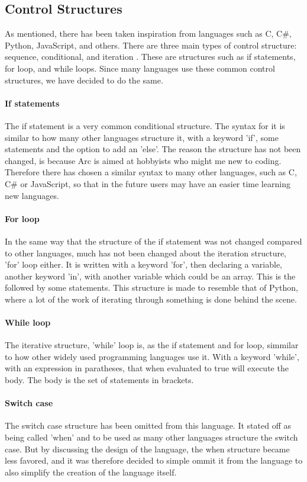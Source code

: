 \subsection{Control Structures}
As mentioned, there has been taken inspiration from languages such as C, C\#, Python, JavaScript, and others. There are three main types of control structure: sequence, conditional, and iteration \cite*{CBook}. These are structures such as if statements, for loop, and while loops. Since many languages use these common control structures, we have decided to do the same.

\paragraph*{If statements}
The if statement is a very common conditional structure. The syntax for it is similar to how many other languages structure it, with a keyword 'if', some statements and the option to add an 'else'. The reason the structure has not been changed, is because Arc is aimed at hobbyists who might me new to coding. Therefore there has chosen a similar syntax to many other languages, such as C, C\# or JavaScript, so that in the future users may have an easier time learning new languages.

\paragraph*{For loop}
In the same way that the structure of the if statement was not changed compared to other languages, much has not been changed about the iteration structure, 'for' loop either. It is written with a keyword 'for', then declaring a variable, another keyword 'in', with another variable which could be an array. This is the followed by some statements.
This structure is made to resemble that of Python, where a lot of the work of iterating through something is done behind the scene.

\paragraph*{While loop}
The iterative structure, 'while' loop is, as the if statement and for loop, simmilar to how other widely used programming languages use it. With a keyword 'while', with an expression in paratheses, that when evaluated to true will execute the body. The body is the set of statements in brackets. 

\paragraph*{Switch case}
The switch case structure has been omitted from this language. It stated off as being called 'when' and to be used as many other languages structure the switch case. But by discussing the design of the language, the when structure became less favored, and it was therefore decided to simple ommit it from the language to also simplify the creation of the language itself.
